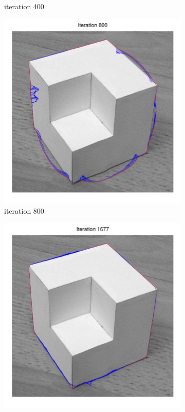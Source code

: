 \documentclass[11pt,a4paper]{article}
\begin{document}
\begin{figure}[H]
\begin{subfigure}[t]{0.21\textwidth}
        \caption{iteration 400}
        \label{fig:cubic_400}
    \end{subfigure}
    \begin{subfigure}[t]{0.21\textwidth}
        \includegraphics[width=\textwidth]{src/images/cubic_800.pdf}
        \caption{iteration 800}
        \label{fig:cubic_800}
    \end{subfigure}
    \begin{subfigure}[t]{0.21\textwidth}
        \includegraphics[width=\textwidth]{src/images/cubic_1677.pdf}

\end{subfigure}
\end{figure}
\end{document}
